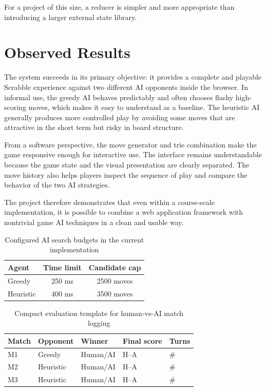 \documentclass[conference]{IEEEtran}
\begin{document}
For a project of this size, a reducer is simpler and more appropriate than introducing a larger external state library.

\section{Observed Results}
The system succeeds in its primary objective: it provides a complete and playable Scrabble experience against two different AI opponents inside the browser. In informal use, the greedy AI behaves predictably and often chooses flashy high-scoring moves, which makes it easy to understand as a baseline. The heuristic AI generally produces more controlled play by avoiding some moves that are attractive in the short term but risky in board structure.

From a software perspective, the move generator and trie combination make the game responsive enough for interactive use. The interface remains understandable because the game state and the visual presentation are clearly separated. The move history also helps players inspect the sequence of play and compare the behavior of the two AI strategies.

The project therefore demonstrates that even within a course-scale implementation, it is possible to combine a web application framework with nontrivial game AI techniques in a clean and usable way.

\begin{table}[t]
\caption{Configured AI search budgets in the current implementation}
\label{tab:budgets}
\centering
\begin{tabular}{lcc}
\toprule
Agent & Time limit & Candidate cap \\
\midrule
Greedy & 250 ms & 2500 moves \\
Heuristic & 400 ms & 3500 moves \\
\bottomrule
\end{tabular}
\end{table}

\begin{table}[t]
\caption{Compact evaluation template for human-vs-AI match logging}
\label{tab:matchlog}
\centering
\begin{tabular}{>{\raggedright\arraybackslash}p{0.95cm} >{\raggedright\arraybackslash}p{1.2cm} >{\centering\arraybackslash}p{0.95cm} >{\centering\arraybackslash}p{1.4cm} >{\centering\arraybackslash}p{0.85cm}}
\toprule
Match & Opponent & Winner & Final score & Turns \\
\midrule
M1 & Greedy & Human/AI & H--A & \# \\
M2 & Heuristic & Human/AI & H--A & \# \\
M3 & Heuristic & Human/AI & H--A & \# \\
\bottomrule
\end{tabular}
\end{table}
\end{document}
